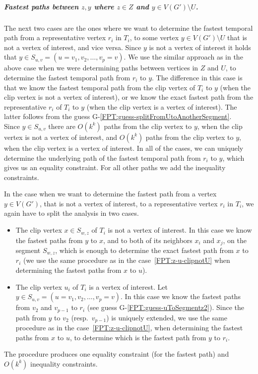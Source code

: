 \documentclass[a4paper,UKenglish,cleveref, autoref, thm-restate, anonymous]{lipics-v2021}
\begin{document}
\subparagraph{\boldmath Fastest paths between $z,y$ where $z \in Z$ and $y \in V(G') \setminus U$.}
The next two cases are the ones where we want to determine the fastest temporal path from a representative vertex $r_i$ in $T_i$, to some vertex $y \in V(G') \setminus U$ that is not a vertex of interest,
and vice versa.
Since $y$ is not a vertex of interest it holds that $y \in S_{u,v}=(u = v_1, v_2, \dots, v_p = v)$. %
We use the similar approach as in the above case when we were determining paths between vertices in $Z$ and $U$, 
to determine the fastest temporal path from $r_i$ to $y$. 
The difference in this case is that 
we know the fastest temporal path from the clip vertex of $T_i$ to $y$
(when the clip vertex is not a vertex of interest),
or we know the exact fastest path from the representative $r_i$ of $T_i$ to $y$
(when the clip vertex is a vertex of interest).
The latter follows from the guess G-\ref{FPT:guess-splitFromUtoAnotherSegment}.\\
%
Since $y \in S_{u,v}$ there are $O(k^{k})$ paths from the clip vertex to $y$, when the clip vertex is not a vertex of interest,
and $O(k^{k})$ paths from the clip vertex to $y$, when the clip vertex is a vertex of interest.
In all of the cases, we can uniquely determine the underlying path of the fastest temporal path from $r_i$ to $y$, which gives us an equality constraint.
For all other paths we add the inequality constraints. 

In the case when we want to determine the fastest path from a vertex $y \in V(G')$, that is not a vertex of interest,
to a representative vertex $r_i$ in $T_i$, 
we 
again have to split the analysis in two cases. 
\begin{itemize}
    \item The clip vertex $x \in S_{w,z}$ of $T_i$ is not a vertex of interest.
In this case we
know the fastest paths from $y$ to $x$, and to both of its neighbors $x_{i}$ and $x_{j}$, on the segment $S_{w,z}$,
which is enough to determine the exact fastest path from $x$ to $r_i$ 
(we use the same procedure as in the case~\ref{FPT:z-u-clipnotU} when determining the fastest paths from $x$ to $u$). 
    \item The clip vertex $u_i$ of $T_i$ is a vertex of interest.
Let $y \in S_{u,v} = (u = v_1,v_2, \dots, v_p = v)$.
In this case we know the fastest paths from $v_2$ and $v_{p-1}$ to $r_i$ (see guess G-\ref{FPT:guess-uToSegmentz2}).
Since the path from $y$ to $v_2$ (resp.~$v_{p-1}$) is uniquely extended, 
we use the same procedure as in the 
case~\ref{FPT:z-u-clipnotU}, when determining the fastest paths from $x$ to $u$,
to determine which is the fastest path from $y$ to $r_i$.
\end{itemize}
The procedure produces one equality constraint (for the fastest path) and $O(k^k)$ inequality constraints.
\end{document}
